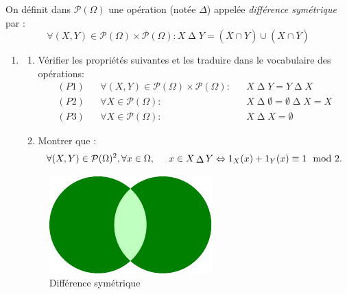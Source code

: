 On définit dans $\mathcal P(\Omega)$ une opération (notée $\Delta$) appelée \emph{différence symétrique} par :
\begin{displaymath}
 \forall (X,Y)\in \mathcal P(\Omega)\times \mathcal P(\Omega) :
X \mathop{\Delta} Y = (\overline{X}\cap Y)\cup(X \cap \overline{Y})
\end{displaymath}
\begin{enumerate}
 \item \begin{enumerate}
 \item Vérifier les propriétés suivantes et les traduire dans le vocabulaire des opérations:
\begin{align*}
(P1)& &\forall (X,Y)\in \mathcal P(\Omega)\times \mathcal P(\Omega) :& &X \mathop{\Delta} Y = Y \mathop{\Delta} X \\
(P2)& &\forall X \in \mathcal P(\Omega) :& &X \mathop{\Delta} \emptyset = \emptyset \mathop{\Delta} X = X\\
(P3)& &\forall X \in \mathcal P(\Omega) :& &X \mathop{\Delta} X = \emptyset 
\end{align*}
\item Montrer que :
\begin{displaymath}
\forall (X,Y)\in \mathcal P(\Omega)^2, \forall x\in \Omega,\hspace{0.5cm} x \in X \mathop{\Delta} Y \Leftrightarrow 1_X(x) + 1_Y(x) \equiv 1 \mod 2.  
\end{displaymath}

\end{enumerate}

\begin{figure}[ht]
 \centering
%
\includegraphics{./Ehamm_1.pdf}
\caption{Différence symétrique}
\label{fig:Ehamm_1}
\end{figure}


\end{enumerate}
